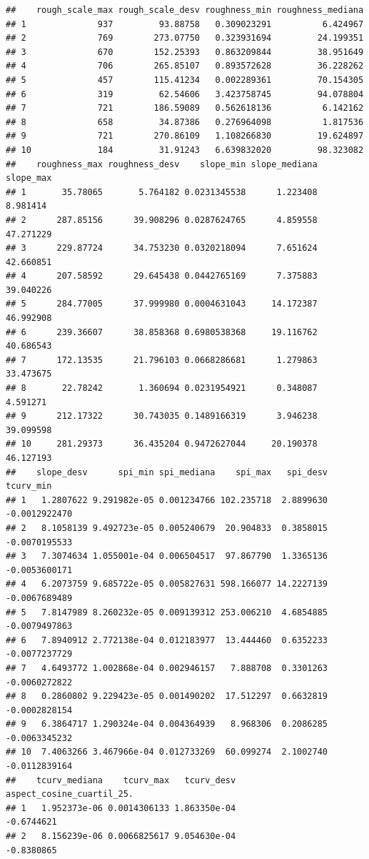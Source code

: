\documentclass[11pt,]{article}
\begin{document}
\begin{verbatim}
##    rough_scale_max rough_scale_desv roughness_min roughness_mediana
## 1              937         93.88758   0.309023291          6.424967
## 2              769        273.07750   0.323931694         24.199351
## 3              670        152.25393   0.863209844         38.951649
## 4              706        265.85107   0.893572628         36.228262
## 5              457        115.41234   0.002289361         70.154305
## 6              319         62.54606   3.423758745         94.078804
## 7              721        186.59089   0.562618136          6.142162
## 8              658         34.87386   0.276964098          1.817536
## 9              721        270.86109   1.108266830         19.624897
## 10             184         31.91243   6.639832020         98.323082
##    roughness_max roughness_desv    slope_min slope_mediana slope_max
## 1       35.78065       5.764182 0.0231345538      1.223408  8.981414
## 2      287.85156      39.908296 0.0287624765      4.859558 47.271229
## 3      229.87724      34.753230 0.0320218094      7.651624 42.660851
## 4      207.58592      29.645438 0.0442765169      7.375883 39.040226
## 5      284.77005      37.999980 0.0004631043     14.172387 46.992908
## 6      239.36607      38.858368 0.6980538368     19.116762 40.686543
## 7      172.13535      21.796103 0.0668286681      1.279863 33.473675
## 8       22.78242       1.360694 0.0231954921      0.348087  4.591271
## 9      212.17322      30.743035 0.1489166319      3.946238 39.099598
## 10     281.29373      36.435204 0.9472627044     20.190378 46.127193
##    slope_desv      spi_min spi_mediana    spi_max   spi_desv     tcurv_min
## 1   1.2807622 9.291982e-05 0.001234766 102.235718  2.8899630 -0.0012922470
## 2   8.1058139 9.492723e-05 0.005240679  20.904833  0.3858015 -0.0070195533
## 3   7.3074634 1.055001e-04 0.006504517  97.867790  1.3365136 -0.0053600171
## 4   6.2073759 9.685722e-05 0.005827631 598.166077 14.2227139 -0.0067689489
## 5   7.8147989 8.260232e-05 0.009139312 253.006210  4.6854885 -0.0079497863
## 6   7.8940912 2.772138e-04 0.012183977  13.444460  0.6352233 -0.0077237729
## 7   4.6493772 1.002868e-04 0.002946157   7.888708  0.3301263 -0.0060272822
## 8   0.2860802 9.229423e-05 0.001490202  17.512297  0.6632819 -0.0002828154
## 9   6.3864717 1.290324e-04 0.004364939   8.968306  0.2086285 -0.0063345232
## 10  7.4063266 3.467966e-04 0.012733269  60.099274  2.1002740 -0.0112839164
##    tcurv_mediana    tcurv_max   tcurv_desv aspect_cosine_cuartil_25.
## 1   1.952373e-06 0.0014306133 1.863350e-04                -0.6744621
## 2   8.156239e-06 0.0066825617 9.054630e-04                -0.8380865

\end{verbatim}
\end{document}
